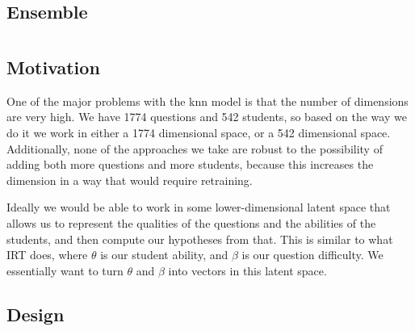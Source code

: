 \documentclass[twocolumn]{article}
\begin{document}
\subsection{Ensemble}
\blindtext

\section{}

\subsection{Motivation}

One of the major problems with the {\sc knn} model is that the number of
dimensions are very high. We have 1774 questions and 542 students, so based on
the way we do it we work in either a 1774 dimensional space, or a 542
dimensional space. Additionally, none of the approaches we take are robust to
the possibility of adding both more questions and more students, because this
increases the dimension in a way that would require retraining.

Ideally we would be able to work in some lower-dimensional latent space that
allows us to represent the qualities of the questions and the abilities of the
students, and then compute our hypotheses from that. This is similar to what
IRT does, where $\theta$ is our student ability, and $\beta$ is our question
difficulty. We essentially want to turn $\theta$ and $\beta$ into vectors in
this latent space.

\subsection{Design}
\end{document}
